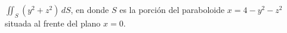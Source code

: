 \item $\iint_S (y^2 + z^2) \, dS$, en donde $S$ es la porción del paraboloide $x = 4 - y^2 - z^2$ situada al frente del plano $x = 0$.
